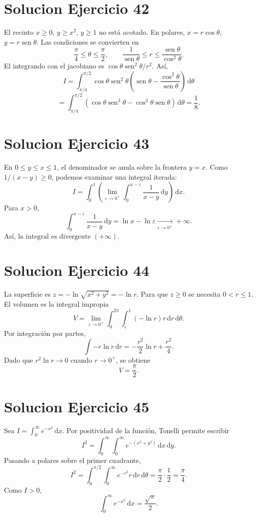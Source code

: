 \documentclass[11pt,a4paper]{article}
\DeclareMathOperator{\sen}{sen}
\newcommand{\dd}{\,\mathrm{d}}
\begin{document}
\section{Solucion Ejercicio 42}
El recinto $x\ge0$, $y\ge x^2$, $y\ge1$ no está acotado. En polares, $x=r\cos\theta$, $y=r\sen\theta$. Las condiciones se convierten en
\[\frac\pi4\le\theta\le\frac\pi2,\qquad \frac1{\sen\theta}\le r\le\frac{\sen\theta}{\cos^2\theta}.\]
El integrando con el jacobiano es $\cos\theta\sen^2\theta/r^2$. Así,
\[I=\int_{\pi/4}^{\pi/2}\cos\theta\sen^2\theta\left(\sen\theta-\frac{\cos^2\theta}{\sen\theta}\right)\dd\theta\]
\[=\int_{\pi/4}^{\pi/2}(\cos\theta\sen^3\theta-\cos^3\theta\sen\theta)\dd\theta=\boxed{\frac18}.\]

\section{Solucion Ejercicio 43}
En $0\le y\le x\le1$, el denominador se anula sobre la frontera $y=x$. Como $1/(x-y)\ge0$, podemos examinar una integral iterada:
\[I=\int_0^1\left(\lim_{\varepsilon\to0^+}\int_0^{x-\varepsilon}\frac{1}{x-y}\dd y\right)\dd x.\]
Para $x>0$,
\[\int_0^{x-\varepsilon}\frac{1}{x-y}\dd y=\ln x-\ln\varepsilon\xrightarrow[\varepsilon\to0^+]{}+\infty.\]
Así, $\boxed{\text{la integral es divergente }(+\infty)}$.

\section{Solucion Ejercicio 44}
La superficie es $z=-\ln\sqrt{x^2+y^2}=-\ln r$. Para que $z\ge0$ se necesita $0<r\le1$. El volumen es la integral impropia
\[V=\lim_{\varepsilon\to0^+}\int_0^{2\pi}\int_\varepsilon^1(-\ln r)r\dd r\dd\theta.\]
Por integración por partes,
\[\int-r\ln r\dd r=-\frac{r^2}{2}\ln r+\frac{r^2}{4}.\]
Dado que $r^2\ln r\to0$ cuando $r\to0^+$, se obtiene
\[\boxed{V=\frac\pi2}.\]

\section{Solucion Ejercicio 45}
Sea $I=\int_0^\infty e^{-x^2}\dd x$. Por positividad de la función, Tonelli permite escribir
\[I^2=\int_0^\infty\int_0^\infty e^{-(x^2+y^2)}\dd x\dd y.\]
Pasando a polares sobre el primer cuadrante,
\[I^2=\int_0^{\pi/2}\int_0^\infty e^{-r^2}r\dd r\dd\theta=\frac\pi2\cdot\frac12=\frac\pi4.\]
Como $I>0$,
\[\boxed{\int_0^\infty e^{-x^2}\dd x=\frac{\sqrt\pi}{2}}.\]
\end{document}
